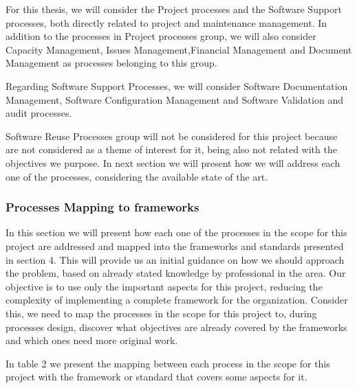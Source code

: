 For this thesis, we will consider the Project processes and the Software Support processes, both directly related to project and maintenance management. In addition to the processes in Project processes group, we will also consider Capacity Management, Issues Management,Financial Management and Document Management as processes belonging to this group.\par
Regarding Software Support Processes, we will consider Software Documentation Management, Software Configuration Management and Software Validation and audit processes.\par
Software Reuse Processes group will not be considered for this project because are not considered as a theme of interest for it, being also not related with the objectives we purpose. In next section we will present how we will address each one of the processes, considering the available state of the art.\par

\subsubsection{Processes Mapping to frameworks}

In this section we will present how each one of the processes in the scope for this project are addressed and mapped into the frameworks and standards presented in section 4. This will provide us an initial guidance on how we should approach the problem, based on already stated knowledge by professional in the area. Our objective is to use only the important aspects for this project, reducing the complexity of implementing a complete framework for the organization. Consider this, we need to map the processes in the scope for this project to, during processes design, discover what objectives are already covered by the frameworks and which ones need more original work.\par
In table 2 we present the mapping between each process in the scope for this project with the framework or standard that covers some aspects for it.\par


